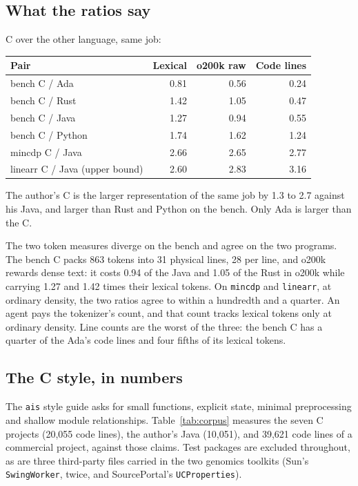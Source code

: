 \documentclass[11pt,a4paper]{article}
\begin{document}
\subsection{What the ratios say}

C over the other language, same job:

\begin{center}
\small
\begin{tabular}{lrrr}
\toprule
Pair & Lexical & o200k raw & Code lines \\
\midrule
bench C / Ada & 0.81 & 0.56 & 0.24 \\
bench C / Rust & 1.42 & 1.05 & 0.47 \\
bench C / Java & 1.27 & 0.94 & 0.55 \\
bench C / Python & 1.74 & 1.62 & 1.24 \\
mincdp C / Java & 2.66 & 2.65 & 2.77 \\
linearr C / Java (upper bound) & 2.60 & 2.83 & 3.16 \\
\bottomrule
\end{tabular}
\end{center}

The author's C is the larger representation of the same job by 1.3 to 2.7 against his Java, and larger than Rust and Python on the bench. Only Ada is larger than the C.

The two token measures diverge on the bench and agree on the two programs. The bench C packs 863 tokens into 31 physical lines, 28 per line, and o200k rewards dense text: it costs 0.94 of the Java and 1.05 of the Rust in o200k while carrying 1.27 and 1.42 times their lexical tokens. On \texttt{mincdp} and \texttt{linearr}, at ordinary density, the two ratios agree to within a hundredth and a quarter. An agent pays the tokenizer's count, and that count tracks lexical tokens only at ordinary density. Line counts are the worst of the three: the bench C has a quarter of the Ada's code lines and four fifths of its lexical tokens.

\subsection{The C style, in numbers}

The \texttt{ais} style guide \cite{ais-style} asks for small functions, explicit state, minimal preprocessing and shallow module relationships. Table~\ref{tab:corpus} measures the seven C projects (20,055 code lines), the author's Java (10,051), and 39,621 code lines of a commercial project, against those claims. Test packages are excluded throughout, as are three third-party files carried in the two genomics toolkits (Sun's \texttt{SwingWorker}, twice, and SourcePortal's \texttt{UCProperties}).
\end{document}
